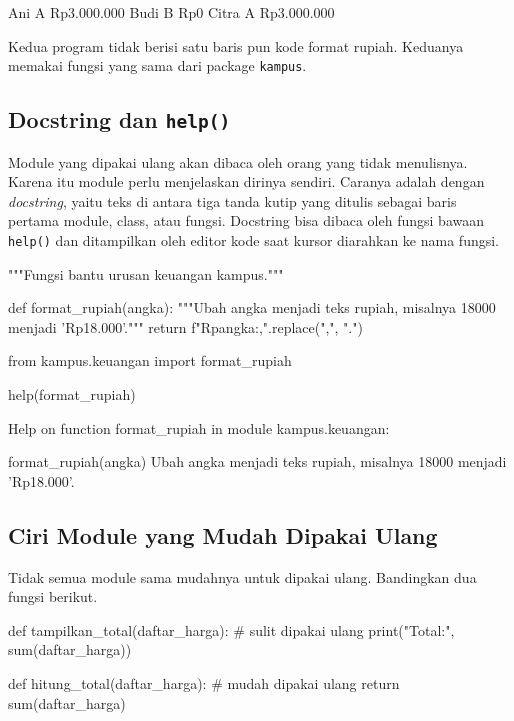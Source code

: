 \begin{keluaran}
Ani    A  Rp3.000.000
Budi   B  Rp0
Citra  A  Rp3.000.000
\end{keluaran}

Kedua program tidak berisi satu baris pun kode format rupiah. Keduanya memakai fungsi yang sama dari package \texttt{kampus}.

\subsection{Docstring dan \texttt{help()}}

Module yang dipakai ulang akan dibaca oleh orang yang tidak menulisnya. Karena itu module perlu menjelaskan dirinya sendiri. Caranya adalah dengan \emph{docstring}, yaitu teks di antara tiga tanda kutip yang ditulis sebagai baris pertama module, class, atau fungsi. Docstring bisa dibaca oleh fungsi bawaan \texttt{help()} dan ditampilkan oleh editor kode saat kursor diarahkan ke nama fungsi.

\begin{kode}
"""Fungsi bantu urusan keuangan kampus."""

def format_rupiah(angka):
    """Ubah angka menjadi teks rupiah, misalnya 18000 menjadi 'Rp18.000'."""
    return f"Rp{angka:,}".replace(",", ".")
\end{kode}

\begin{kode}
from kampus.keuangan import format_rupiah

help(format_rupiah)
\end{kode}

\begin{keluaran}
Help on function format_rupiah in module kampus.keuangan:

format_rupiah(angka)
    Ubah angka menjadi teks rupiah, misalnya 18000 menjadi 'Rp18.000'.
\end{keluaran}

\subsection{Ciri Module yang Mudah Dipakai Ulang}

Tidak semua module sama mudahnya untuk dipakai ulang. Bandingkan dua fungsi berikut.

\begin{kode}
def tampilkan_total(daftar_harga):          # sulit dipakai ulang
    print("Total:", sum(daftar_harga))

def hitung_total(daftar_harga):             # mudah dipakai ulang
    return sum(daftar_harga)
\end{kode}

